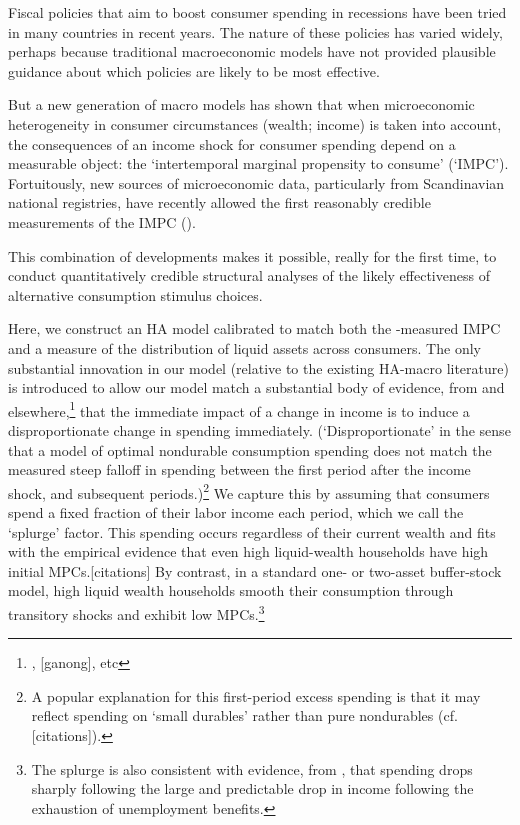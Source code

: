 \documentclass[../HAFiscal]{subfiles}
\begin{document}
Fiscal policies that aim to boost consumer spending in recessions have been tried in many countries in recent years.  The nature of these policies has varied widely, perhaps because traditional macroeconomic models have not provided plausible guidance about which policies are likely to be most effective.

But a new generation of macro models has shown that when microeconomic heterogeneity in consumer circumstances (wealth; income) is taken into account, the consequences of an income shock for consumer spending depend on a measurable object: the `intertemporal marginal propensity to consume' (`IMPC').  Fortuitously, new sources of microeconomic data, particularly from Scandinavian national registries, have recently allowed the first reasonably credible measurements of the IMPC (\cite{fagering_mpc_2021}).

This combination of developments makes it possible, really for the first time, to conduct quantitatively credible structural analyses of the likely effectiveness of alternative consumption stimulus choices.

Here, we construct an HA model calibrated to match both the \cite{fagereng_mpc_2021}-measured IMPC and a measure of the distribution of liquid assets across consumers.  The only substantial innovation in our model (relative to the existing HA-macro literature) is introduced to allow our model match a substantial body of evidence, from \cite{fagereng_mpc_2021} and elsewhere,\footnote{\cite{parker_etal}, [ganong], etc} that the immediate impact of a change in income is to induce a disproportionate change in spending immediately.  (`Disproportionate' in the sense that a model of optimal nondurable consumption spending does not match the measured steep falloff in spending between the first period after the income shock, and subsequent periods.)\footnote{A popular explanation for this first-period excess spending is that it may reflect spending on `small durables' rather than pure nondurables (cf. [citations]).}  We capture this by assuming that consumers spend a fixed fraction of their labor income each period, which we call the `splurge' factor. This spending occurs regardless of their current wealth and fits with the empirical evidence that even high liquid-wealth households have high initial MPCs.[citations] By contrast, in a standard one- or two-asset buffer-stock model, high liquid wealth households smooth their consumption through transitory shocks and exhibit low MPCs.\footnote{The splurge is also consistent with evidence, from \cite{ganongConsumer2019}, that spending drops sharply following the large and predictable drop in income following the exhaustion of unemployment benefits.}
\end{document}
